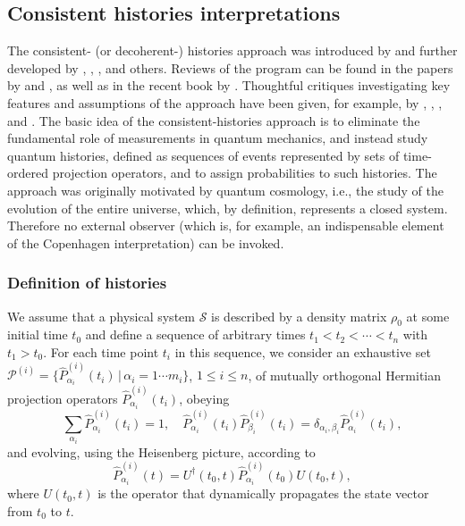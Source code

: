 \documentclass[rmp,aps,amsmath,amsfonts,noshowkeys,noshowpacs,12pt]{revtex4}
\begin{document}
\subsection{Consistent histories interpretations}

The consistent- (or decoherent-) histories approach was introduced by
\citet{Griffiths:1984:tr,Griffiths:1993:ll,Griffiths:1996:re} and
further developed by
\citet{Omnes:1988:lz,Omnes:1988:lq,Omnes:1988:zg,Omnes:1990:ww,%
  Omnes:1992:gy,Omnes:1994:pz,Omnes:2003:tt},
\citet{GellMann:1990:uz,GellMann:1991:wk,GellMann:1991:pp,GellMann:1993:oi},
\citet{Dowker:1992:vz}, and others.  Reviews of the program can be
found in the papers by \citet{Omnes:1992:gy} and
\citet{Halliwell:1993:ds,Halliwell:1995:gh}, as well as in the recent
book by \citet{Griffiths:2002:tr}. Thoughtful critiques investigating
key features and assumptions of the approach have been given, for
example, by \citet{Espagnat:1989:fl},
\citet{Dowker:1995:pa,Dowker:1996:ch}, \citet{Kent:1998:th}, and
\citet{Bassi:1999:zp}. The basic idea of the consistent-histories
approach is to eliminate the fundamental role of measurements in
quantum mechanics, and instead study quantum histories, defined as
sequences of events represented by sets of time-ordered projection
operators, and to assign probabilities to such histories. The approach
was originally motivated by quantum cosmology, i.e., the study of the
evolution of the entire universe, which, by definition, represents a
closed system. Therefore no external observer (which is, for example,
an indispensable element of the Copenhagen interpretation) can be
invoked.


\subsubsection{Definition of histories} 

We assume that a physical system $\mathcal{S}$ is described by a
density matrix $\rho_0$ at some initial time $t_0$ and define a sequence
of arbitrary times $t_1 < t_2 < \cdots < t_n$ with $t_1 > t_0$. For
each time point $t_i$ in this sequence, we consider an exhaustive set
$\mathcal{P}^{(i)} = \{ \widehat{P}^{(i)}_{\alpha_i}(t_i) \, | \,
\alpha_i = 1 \cdots m_i \}$, $1 \le i \le n$, of mutually orthogonal
Hermitian projection operators $\widehat{P}^{(i)}_{\alpha_i}(t_i)$,
obeying
%
\begin{equation} 
\sum_{\alpha_i} \widehat{P}^{(i)}_{\alpha_i}(t_i) = 1, \quad
\widehat{P}^{(i)}_{\alpha_i}(t_i) \widehat{P}^{(i)}_{\beta_i}(t_i) =
\delta_{\alpha_i,\beta_i} \widehat{P}^{(i)}_{\alpha_i}(t_i), 
\end{equation}
%
and evolving, using the Heisenberg picture, according to
%
\begin{equation}
\widehat{P}^{(i)}_{\alpha_i}(t) = U^\dagger(t_0,t)
\widehat{P}^{(i)}_{\alpha_i}(t_0) U(t_0,t),
\end{equation}
%
where $U(t_0,t)$ is the operator that dynamically propagates the state
vector from $t_0$ to $t$.
\end{document}
